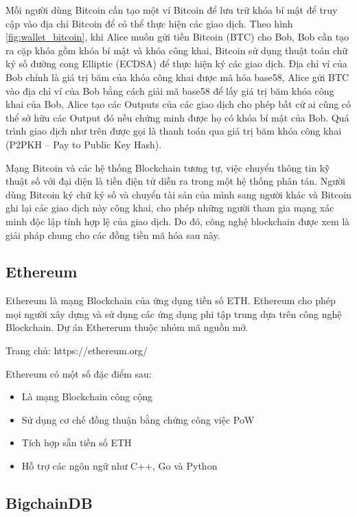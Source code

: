Mỗi người dùng Bitcoin cần tạo một ví Bitcoin để lưu trữ khóa bí mật để truy cập vào địa chỉ Bitcoin để có thể thực hiện các giao dịch. 
Theo hình \ref{fig:wallet_bitcoin}, khi Alice muốn gửi tiền Bitcoin (BTC) cho Bob, Bob cần tạo ra cặp khóa gồm khóa bí mật và khóa công khai, Bitcoin sử dụng thuật toán chữ ký số đường cong Elliptic (ECDSA) \cite{10.5555/1721909} để thực hiện ký các giao dịch. 
Địa chỉ ví của Bob chính là giá trị băm của khóa công khai được mã hóa base58, Alice gửi BTC vào địa chỉ ví của Bob bằng cách giải mã base58 để lấy giá trị băm khóa công khai của Bob, Alice tạo các Outputs của các giao dịch cho phép bất cứ ai cũng có thể sở hữu các Output đó nếu chứng minh được họ có khóa bí mật của Bob. 
Quá trình giao dịch như trên được gọi là thanh toán qua giá trị băm khóa công khai (P2PKH – Pay to Public Key Hash).

Mạng Bitcoin và các hệ thống Blockchain tương tự, việc chuyển thông tin kỹ thuật số với đại diện là tiền điện tử diễn ra trong một hệ thống phân tán.
Người dùng Bitcoin ký chữ ký số và chuyển tài sản của mình sang người khác và Bitcoin ghi lại các giao dịch này công khai, cho phép những người tham gia mạng xác minh độc lập tính hợp lệ của giao dịch. 
Do đó, công nghệ blockchain được xem là giải pháp chung cho các đồng tiền mã hóa sau này.

\subsection{Ethereum}

Ethereum là mạng Blockchain của ứng dụng tiền số ETH. Ethereum cho phép mọi người xây dựng và sử dụng các ứng dụng phi tập trung dựa trên công nghệ Blockchain. 
Dự án Ethererum thuộc nhóm mã nguồn mở.

Trang chủ: https://ethereum.org/

Ethereum có một số đặc điểm sau:

\begin{itemize}
	\item Là mạng Blockchain công cộng
	\item Sử dụng cơ chế đồng thuận bằng chứng công việc PoW
	\item Tích hợp sẵn tiền số ETH
	\item Hỗ trợ các ngôn ngữ như C++, Go và Python
\end{itemize}

\subsection{BigchainDB}

